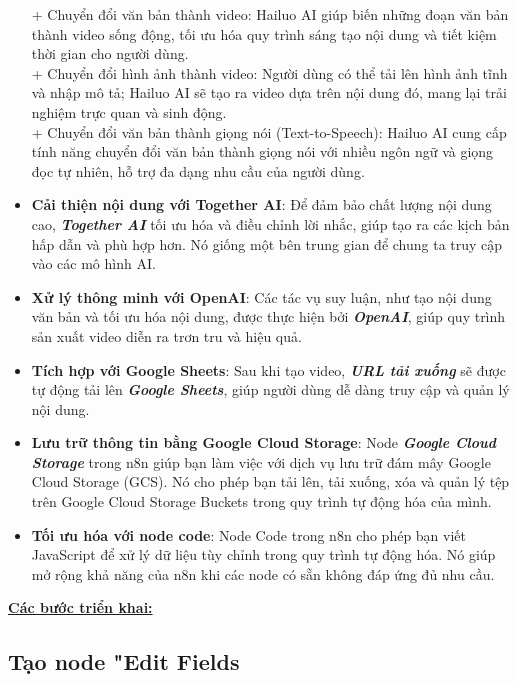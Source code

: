 \begin{itemize}[label=-]
    + Chuyển đổi văn bản thành video: Hailuo AI giúp biến những đoạn văn bản thành video sống động, tối ưu hóa quy trình sáng tạo nội dung và tiết kiệm thời gian cho người dùng.\\
    + Chuyển đổi hình ảnh thành video: Người dùng có thể tải lên hình ảnh tĩnh và nhập mô tả; Hailuo AI sẽ tạo ra video dựa trên nội dung đó, mang lại trải nghiệm trực quan và sinh động.\\
    + Chuyển đổi văn bản thành giọng nói (Text-to-Speech): Hailuo AI cung cấp tính năng chuyển đổi văn bản thành giọng nói với nhiều ngôn ngữ và giọng đọc tự nhiên, hỗ trợ đa dạng nhu cầu của người dùng. 
    \item \textbf{Cải thiện nội dung với Together AI}: Để đảm bảo chất lượng nội dung cao, \textbf{\emph{Together AI}} tối ưu hóa và điều chỉnh lời nhắc, giúp tạo ra các kịch bản hấp dẫn và phù hợp hơn. Nó giống một bên trung gian để chung ta truy cập vào các mô hình AI.
    \item \textbf{Xử lý thông minh với OpenAI}: Các tác vụ suy luận, như tạo nội dung văn bản và tối ưu hóa nội dung, được thực hiện bởi \textbf{\emph{OpenAI}}, giúp quy trình sản xuất video diễn ra trơn tru và hiệu quả. 
    \item \textbf{Tích hợp với Google Sheets}: Sau khi tạo video, \textbf{\emph{URL tải xuống}} sẽ được tự động tải lên \textbf{\emph{Google Sheets}}, giúp người dùng dễ dàng truy cập và quản lý nội dung. 
     \item \textbf{Lưu trữ thông tin bằng Google Cloud Storage}: Node \textbf{\emph{Google Cloud Storage}} trong n8n giúp bạn làm việc với dịch vụ lưu trữ đám mây Google Cloud Storage (GCS). Nó cho phép bạn tải lên, tải xuống, xóa và quản lý tệp trên Google Cloud Storage Buckets trong quy trình tự động hóa của mình. 
     \item \textbf{Tối ưu hóa với node code}: Node Code trong n8n cho phép bạn viết JavaScript để xử lý dữ liệu tùy chỉnh trong quy trình tự động hóa. Nó giúp mở rộng khả năng của n8n khi các node có sẵn không đáp ứng đủ nhu cầu.   
\end{itemize}

\underline{\textbf{ Các bước triển khai:}}

\subsection{Tạo node "Edit Fields}

